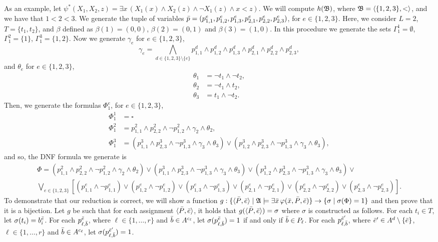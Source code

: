 \begin{enumerate}
	As an example, let $\psi^{*}(X_1,X_2,z) = \exists x\, (X_1(x) \wedge X_2(z) \wedge \neg X_1(z) \wedge x < z)$. We will compute $h({\frak B})$, where ${\frak B} = \langle \{1,2,3\}, < \rangle$, and we have that $1 < 2 < 3$. We generate the tuple of variables $\bar{p} = (p^e_{1,1},p^e_{1,2},p^e_{1,3},p^e_{2,1},p^e_{2,2},p^e_{2,3})$, for $e\in \{1,2,3\}$. Here, we consider $L = 2$, $T = \{t_1,t_2\}$, and $\beta$ defined as $\beta(1) = (0,0)$, $\beta(2) = (0,1)$ and $\beta(3) = (1,0)$. In this procedure we generate the sets $\Gamma^1_1 = \emptyset$, $\Gamma^2_1 = \{1\}$, $\Gamma^3_1 = \{1,2\}$. Now we generate $\gamma_e$ for $e\in\{1,2,3\}$,
	\[
	\gamma_e = \bigwedge_{d\in\{1,2,3\}\setminus\{e\}} p^d_{1,1} \wedge p^d_{1,2} \wedge p^d_{1,3} \wedge p^d_{2,1} \wedge p^d_{2,2} \wedge p^d_{2,3},
	\]
	and $\theta_e$ for $e\in\{1,2,3\}$,
	\begin{align*}
	\theta_1 &= \neg t_1 \wedge \neg t_2,\\
	\theta_2 &= \neg t_1 \wedge t_2,\\
	\theta_3 &= t_1 \wedge \neg t_2.		
	\end{align*}
	Then, we generate the formulas $\Phi^e_1$, for $e\in\{1,2,3\}$,
	\begin{align*}
	\Phi^1_1 &= \square\\
	\Phi^2_1 &= p^2_{1,1} \wedge p^2_{2,2} \wedge \neg p^2_{1,2} \wedge \gamma_2 \wedge \theta_2,\\
	\Phi^3_1 &= (p^3_{1,1} \wedge p^3_{2,3} \wedge \neg p^3_{1,3} \wedge \gamma_3 \wedge \theta_3) \vee (p^3_{1,2} \wedge p^3_{2,3} \wedge \neg p^3_{1,3} \wedge \gamma_3 \wedge \theta_3),
	\end{align*}
	and so, the DNF formula we generate is
	\begin{multline*}
	\Phi = (p^2_{1,1} \wedge p^2_{2,2} \wedge \neg p^2_{1,2} \wedge \gamma_2 \wedge \theta_2) \vee (p^3_{1,1} \wedge p^3_{2,3} \wedge \neg p^3_{1,3} \wedge \gamma_3 \wedge \theta_3) \vee (p^3_{1,2} \wedge p^3_{2,3} \wedge \neg p^3_{1,3} \wedge \gamma_3 \wedge \theta_3) \vee \\ \bigvee_{e\in\{1,2,3\}}[(p^e_{1,1}\wedge\neg p^e_{1,1})\vee
	(p^e_{1,2}\wedge\neg p^e_{1,2})\vee
	(p^e_{1,3}\wedge\neg p^e_{1,3})\vee
	(p^e_{2,1}\wedge\neg p^e_{2,1})\vee
	(p^e_{2,2}\wedge\neg p^e_{2,2})\vee
	(p^e_{2,3}\wedge\neg p^e_{2,3})].
	\end{multline*}
	To demonstrate that our reduction is correct, we will show a function $g:\{\langle\bar{P},\bar{e}\rangle \mid \mathfrak{A} \models \exists\bar{x}\,\varphi(\bar{x},\bar{P},\bar{e})\} \to \{\sigma \mid \sigma(\Phi) = 1\}$ and then prove that it is a bijection. Let $g$ be such that for each assignment $\langle \bar{P},\bar{e} \rangle$, it holds that $g(\langle \bar{P},\bar{e} \rangle) = \sigma$ where $\sigma$ is constructed as follows. For each $t_i\in T$, let $\sigma(t_i) = b^{\bar{e}}_i$. For each $p_{\ell,\bar{b}}^{\bar{e}}$, where $\ell\in\{1,\ldots,r\}$ and $\bar{b}\in A^{c_{\ell}}$, let $\sigma(p_{\ell,\bar{b}}^{\bar{e}}) = 1$ if and only if $\bar{b} \in P_{\ell}$. For each $p_{\ell,\bar{b}}^{\bar{e}'}$, where $\bar{e}'\in A^d\setminus\{\bar{e}\}$,  $\ell\in\{1,\ldots,r\}$ and $\bar{b}\in A^{c_{\ell}}$, let $\sigma(p_{\ell,\bar{b}}^{\bar{e}'}) = 1$. 
	

\end{enumerate}
